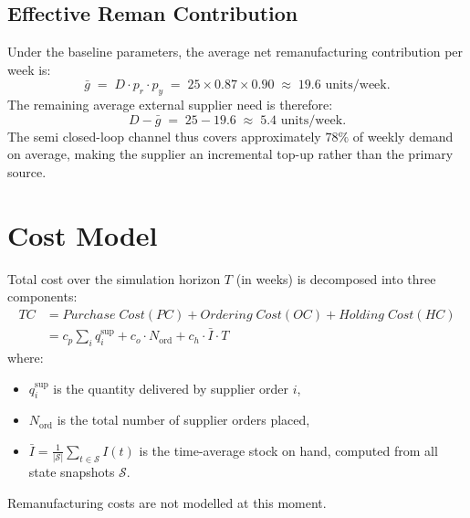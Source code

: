\documentclass[11pt]{article}
\begin{document}
\subsection{Effective Reman Contribution}

Under the baseline parameters, the average net remanufacturing contribution per
week is:
\begin{equation}
  \bar{g} \;=\; D \cdot p_r \cdot p_y
          \;=\; 25 \times 0.87 \times 0.90
          \;\approx\; 19.6 \text{ units/week}.
\end{equation}
The remaining average external supplier need is therefore:
\begin{equation}
  D - \bar{g} \;=\; 25 - 19.6 \;\approx\; 5.4 \text{ units/week}.
\end{equation}
The semi closed-loop channel thus covers approximately $78\%$ of weekly demand on
average, making the supplier an incremental top-up rather than the primary source.

\section{Cost Model}

Total cost over the simulation horizon $T$ (in weeks) is decomposed into three
components:
\begin{equation} \label{eq:tc}
\begin{split}
TC & = Purchase \; Cost (PC) + Ordering \; Cost (OC) + Holding \; Cost (HC) \\
   &= c_p \sum_i q_i^{\mathrm{sup}}
              + c_o \cdot N_{\mathrm{ord}}
              + c_h \cdot \bar{I} \cdot T 
\end{split}
\end{equation}
where:
\begin{itemize}
  \item $q_i^{\mathrm{sup}}$ is the quantity delivered by supplier order $i$,
  \item $N_{\mathrm{ord}}$ is the total number of supplier orders placed,
  \item $\bar{I} = \frac{1}{|\mathcal{S}|}\sum_{t \in \mathcal{S}} I(t)$ is the
        time-average stock on hand, computed from all state snapshots
        $\mathcal{S}$.
\end{itemize}
Remanufacturing costs are not modelled at this moment. 

\end{document}
